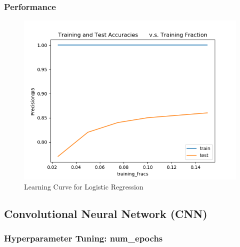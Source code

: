 \documentclass{sig-alternate-05-2015}
\begin{document}
\subsubsection{Performance}
\begin{figure}[H]
\centering
\includegraphics[width=\linewidth]{plots/learning_curve_lr.png}
\caption{Learning Curve for Logistic Regression}
\end{figure}

\subsection{Convolutional Neural Network (CNN)}
\subsubsection{Hyperparameter Tuning: num\_epochs}
\end{document}
